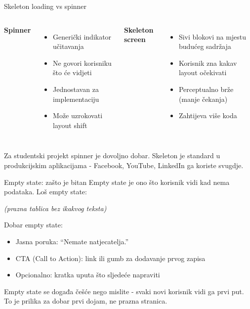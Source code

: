\begin{frame}{Skeleton loading vs spinner}
\begin{columns}[T]
\textbf{Spinner}
\begin{itemize}
  \item Generički indikator učitavanja
  \item Ne govori korisniku što će vidjeti
  \item Jednostavan za implementaciju
  \item Može uzrokovati layout shift
\end{itemize}

\textbf{Skeleton screen}
\begin{itemize}
  \item Sivi blokovi na mjestu budućeg sadržaja
  \item Korisnik zna kakav layout očekivati
  \item Perceptualno brže (manje čekanja)
  \item Zahtijeva više koda
\end{itemize}
\end{columns}

\vspace{0.6em}
Za studentski projekt spinner je dovoljno dobar. Skeleton je standard u produkcijskim aplikacijama - Facebook, YouTube, LinkedIn ga koriste svugdje.
\end{frame}

\begin{frame}{Empty state: zašto je bitan}
Empty state je ono što korisnik vidi kad nema podataka. Loš empty state:

\vspace{0.2em}
\begin{center}
\textit{(prazna tablica bez ikakvog teksta)}
\end{center}

\vspace{0.4em}
Dobar empty state:
\begin{itemize}
  \item Jasna poruka: \enquote{Nemate natjecatelja.}
  \item CTA (Call to Action): link ili gumb za dodavanje prvog zapisa
  \item Opcionalno: kratka uputa što sljedeće napraviti
\end{itemize}

\vspace{0.6em}
Empty state se događa češće nego mislite - svaki novi korisnik vidi ga prvi put. To je prilika za dobar prvi dojam, ne prazna stranica.
\end{frame}

